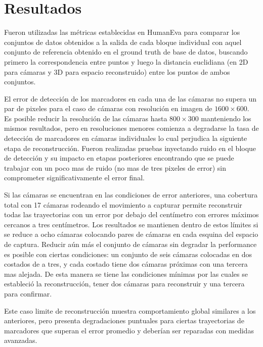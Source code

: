 \section{Resultados}

Fueron utilizadas las métricas establecidas en HumanEva \cite{humaneva} para comparar los conjuntos de datos obtenidos a la salida de cada bloque individual con aquel conjunto de referencia obtenido en el ground truth de base de datos, buscando primero la correspondencia entre puntos y luego la distancia euclidiana (en 2D para cámaras y 3D para espacio reconstruido) entre los puntos de ambos conjuntos.



El error de detección de los marcadores en cada una de las cámaras no supera un par de pixeles para el caso de cámaras con resolución en imagen de $1600\times600$. Es posible reducir la resolución de las cámaras hasta $800\times300$ manteniendo los mismos resultados, pero en resoluciones menores comienza a degradarse la tasa de detección de marcadores en cámaras individuales lo cual perjudica la siguiente etapa de reconstrucción. Fueron realizadas pruebas inyectando ruido en el bloque de detección y su impacto en etapas posteriores encontrando que se puede trabajar con un poco mas de ruido (no mas de tres pixeles de error) sin comprometer significativamente el error final.


Si las cámaras se encuentran en las condiciones de error anteriores, una cobertura total con 17 cámaras rodeando el movimiento a capturar permite reconstruir todas las trayectorias con un error por debajo del centímetro con errores máximos cercanos a tres centímetros. Los resultados se mantienen dentro de estos límites si se reduce a ocho cámaras colocando pares de cámaras en cada esquina del espacio de captura. 
Reducir aún más el conjunto de cámaras sin degradar la performance es posible con ciertas condiciones: un conjunto de seis cámaras colocadas en dos costados de a tres, y cada costado tiene dos cámaras próximas con una tercera mas alejada. De esta manera se tiene las condiciones mínimas por las cuales se estableció la reconstrucción, tener dos cámaras para reconstruir y una tercera para confirmar.


Este caso limite de reconstrucción muestra comportamiento global similares a los anteriores, pero presenta degradaciones puntuales para ciertas trayectorias de marcadores que superan el error promedio y deberían ser reparadas con medidas avanzadas.

